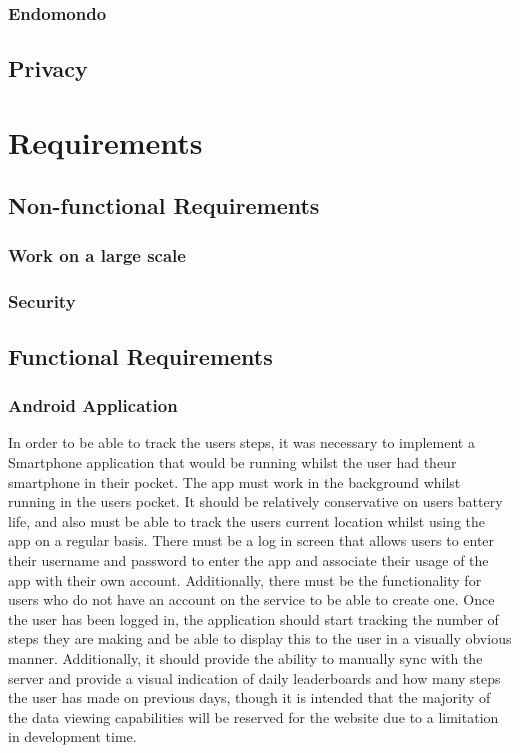 \documentclass{l4proj}
\begin{document}
\subsection{Endomondo}

\section{Privacy}




\chapter{Requirements}

\section{Non-functional Requirements}

\subsection{Work on a large scale}

\subsection{Security}

\section{Functional Requirements}

\subsection{Android Application}

In order to be able to track the users steps, it was necessary to implement a Smartphone application that would be running whilst the user had theur smartphone in their pocket. The app must work in the background whilst running in the users pocket. It should be relatively conservative on users battery life, and also must be able to track the users current location whilst using the app on a regular basis. There must be a log in screen that allows users to enter their username and password to enter the app and associate their usage of the app with their own account. Additionally, there must be the functionality for users who do not have an account on the service to be able to create one. Once the user has been logged in, the application should start tracking the number of steps they are making and be able to display this to the user in a visually obvious manner. Additionally, it should provide the ability to manually sync with the server and provide a visual indication of daily leaderboards and how many steps the user has made on previous days, though it is intended that the majority of the data viewing capabilities will be reserved for the website due to a limitation in development time.
\end{document}

